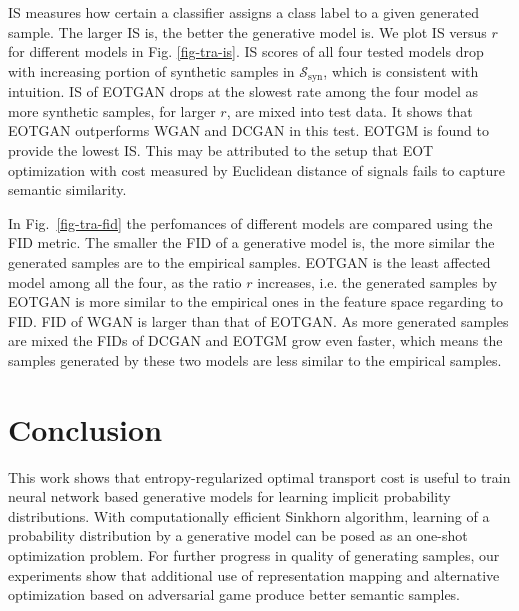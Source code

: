 IS measures how certain a classifier assigns a class label to a given
generated sample. The larger IS is, the better the generative model
is. We plot IS versus $r$ for different models in
Fig. \ref{fig-tra-is}. IS scores of all four tested models drop with
increasing portion of synthetic samples in
$\mathcal{S}_{\mathrm{syn}}$, which is consistent with intuition. IS
of EOTGAN drops at the slowest rate among the four model as more
synthetic samples, for larger $r$, are mixed into test data. It shows
that EOTGAN outperforms WGAN and DCGAN in this test. EOTGM is found to provide the lowest IS.
This may be attributed to the setup that 
EOT optimization with cost measured by Euclidean distance of signals
fails to capture semantic similarity.

In Fig.~\ref{fig-tra-fid} the perfomances of different models are
compared using the FID metric. The smaller the FID of a generative model is, the more similar the
generated samples are to the empirical samples. EOTGAN is the least affected model among all the four, as the ratio $r$ increases, i.e. the generated samples by EOTGAN is more similar to the empirical
ones in the feature space regarding to FID. FID of WGAN is larger than that of EOTGAN. As
more generated samples are mixed the FIDs of DCGAN and EOTGM grow
even faster, which means the samples generated by these two models are
less similar to the empirical samples.
\section{Conclusion}
This work shows that entropy-regularized optimal transport cost is
useful to train neural network based generative models for learning implicit probability
distributions. With computationally efficient Sinkhorn algorithm,
learning of a probability distribution by a generative model can be
posed as an one-shot optimization problem. For further progress in
quality of generating samples, our experiments show that additional use of
representation mapping and alternative optimization based on
adversarial game produce better
semantic samples. 



